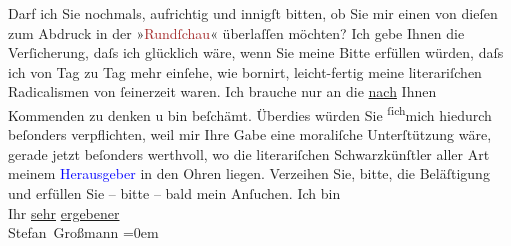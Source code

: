            \pstart
           Darf ich Sie nochmals, aufrichtig und innigſt bitten, ob Sie mir einen von dieſen zum
               Abdruck in der »\textcolor{brown}{Rundſchau}{}\ledrightnote{\textcolor{brown}{Wiener Rundschau}}« überlaſſen möchten? Ich
               gebe Ihnen die Verſicherung, daſs ich glücklich wäre, wenn Sie meine Bitte erfüllen
               würden, daſs ich von Tag zu Tag \strikeout{\textcolor{gray}{×}\-\textcolor{gray}{×}} mehr einſehe, wie bornirt, leicht-fertig meine  literariſchen Radicalismen von ſeinerzeit waren.
               Ich brauche nur an die \uline{nach} Ihnen Kommenden zu denken
               u bin beſchämt.\pend
           \pstart
           Überdies würden Sie \substVorne{}\textsuperscript{ſich}\substDazwischen{}mich\substHinten{} hiedurch beſonders verpflichten, weil mir Ihre Gabe eine moraliſche Unter{\pb}ſtützung wäre, gerade jetzt beſonders
               werthvoll, wo die literariſchen Schwarzkünſtler aller Art meinem \textcolor{blue}{Herausgeber}{} in den
               Ohren liegen.\pend
           \pstart
           Verzeihen Sie, bitte, die Beläſtigung und erfüllen Sie – bitte – bald mein
               Anſuchen.\pend
           \pstart
           Ich bin{\\[\baselineskip]} Ihr \uline{sehr}{ }\uline{ergebener}{\\[\baselineskip]}\spacefill\mbox{Stefan Großmann}\pend
           \leftskip=0em{}\endnumbering{}  
      